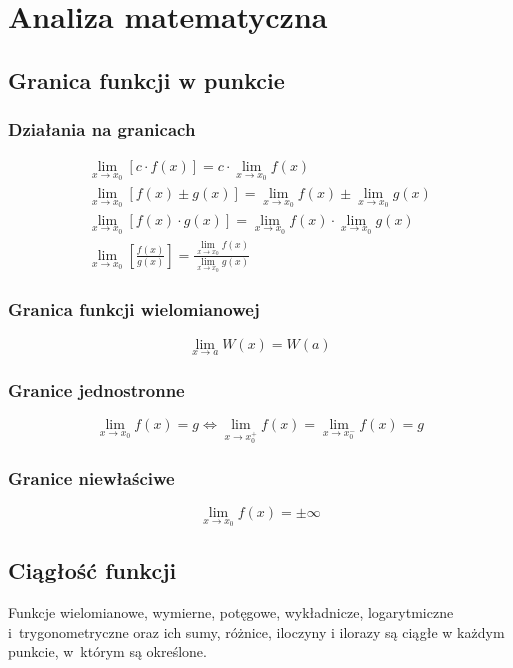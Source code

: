 \chapter{Analiza matematyczna}

\section{Granica funkcji w punkcie}

\subsection{Działania na granicach}
\begin{gather*}
  \lim_{x \to x_0} \left[c \cdot f(x)\right] = c \cdot \lim_{x \to x_0} f(x)\\
  \lim_{x \to x_0} \left[f(x) \pm g(x)\right] = \lim_{x \to x_0} f(x) \pm \lim_{x \to x_0} g(x)\\
  \lim_{x \to x_0} \left[f(x) \cdot g(x)\right] = \lim_{x \to x_0} f(x) \cdot \lim_{x \to x_0} g(x)\\
  \lim_{x \to x_0} \left[\frac{f(x)}{g(x)}\right] =
  \frac{\displaystyle\lim_{x \to x_0} f(x)}{\displaystyle\lim_{x \to x_0} g(x)}
\end{gather*}

\subsection{Granica funkcji wielomianowej}
\begin{equation*}
  \lim_{x \to a} W(x) = W(a)
\end{equation*}

\subsection{Granice jednostronne}
\begin{equation*}
  \lim_{x \to x_0} f(x) = g \Leftrightarrow \lim_{x \to x_0^+} f(x) = \lim_{x \to x_0^-} f(x) = g
\end{equation*}

\subsection{Granice niewłaściwe}
\begin{equation*}
  \lim_{x \to x_0} f(x) = \pm\infty
\end{equation*}

\section{Ciągłość funkcji}
\begin{theorem}
  Funkcje wielomianowe, wymierne, potęgowe, wykładnicze, logarytmiczne i~trygonometryczne oraz ich
  sumy, różnice, iloczyny i ilorazy są ciągłe w każdym punkcie, w~którym są określone.
\end{theorem}

